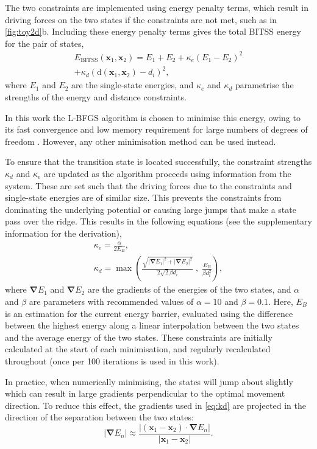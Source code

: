 \documentclass[twocolumn,10pt]{revtex4}
\newcommand{\abs}[1]{\left| #1 \right|}
\newcommand{\grad}{\bm{\nabla}}
\begin{document}
The two constraints are implemented using energy penalty terms, which result in driving forces on the two states if the constraints are not met, such as in \cref{fig:toy2d}b.
Including these energy penalty terms gives the total BITSS energy for the pair of states,
\begin{multline}\label{eq:bitss}
  E_\text{BITSS}(\bm{x}_1, \bm{x}_2) = E_1 + E_2
    + \kappa_e \left( E_1 - E_2 \right) ^2 \\
    + \kappa_d \left( \mathrm{d}(\bm{x}_1, \bm{x}_2) - d_i \right) ^2,
\end{multline}
where $E_1$ and $E_2$ are the single-state energies, and $\kappa_e$ and $\kappa_d$ parametrise the strengths of the energy and distance constraints.

In this work the L-BFGS algorithm is chosen to minimise this energy, owing to its fast convergence and low memory requirement for large numbers of degrees of freedom \cite{Liu1989}.
However, any other minimisation method can be used instead.

To ensure that the transition state is located successfully, the constraint strengths $\kappa_d$ and $\kappa_e$ are updated as the algorithm proceeds using information from the system.
These are set such that the driving forces due to the constraints and single-state energies are of similar size.
This prevents the constraints from dominating the underlying potential or causing large jumps that make a state pass over the ridge.
This results in the following equations (see the supplementary information for the derivation),
\begin{gather}
  \kappa_e = \frac {\alpha} {2 E_B},
  \label{eq:ke}
  \\
  \kappa_d = \max \left(
    \frac {\sqrt{\abs{\grad E_1}^2 + \abs{\grad E_2}^2}} {2\sqrt{2} \beta d_i} \; , \;
    \frac{E_B}{\beta d_i^2} \right),
  \label{eq:kd}
\end{gather}
where $\grad E_1$ and $\grad E_2$ are the gradients of the energies of the two states, and $\alpha$ and $\beta$ are parameters with recommended values of $\alpha = 10$ and $\beta = 0.1$.
Here, $E_B$ is an estimation for the current energy barrier, evaluated using the difference between the highest energy along a linear interpolation between the two states and the average energy of the two states.
These constraints are initially calculated at the start of each minimisation, and regularly recalculated throughout (once per 100 iterations is used in this work).

In practice, when numerically minimising, the states will jump about slightly which can result in large gradients perpendicular to the optimal movement direction.
To reduce this effect, the gradients used in \cref{eq:kd} are projected in the direction of the separation between the two states:
\begin{equation}
  \abs{\grad E_n} \approx \frac {\abs{(\bm{x}_1 - \bm{x}_2) \cdot \grad E_n}} {\abs{\bm{x}_1 - \bm{x}_2}}.
\end{equation}
\end{document}
